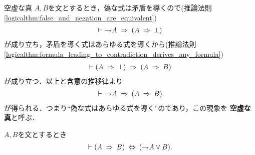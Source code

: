 	\begin{itembox}[l]{空虚な真}
		$A,B$を文とするとき，偽な式は矛盾を導くので(推論法則\ref{logicalthm:false_and_negation_are_equivalent})
		\begin{align}
			\vdash\ \negation A \rarrow (A \rarrow \bot)
		\end{align}
		が成り立ち，矛盾を導く式はあらゆる式を導くから(推論法則\ref{logicalthm:formula_leading_to_contradiction_derives_any_formula})
		\begin{align}
			\vdash (A \rarrow \bot) \rarrow (A \rarrow B)
		\end{align}
		が成り立つ．以上と含意の推移律より
		\begin{align}
			\vdash\ \negation A \rarrow (A \rarrow B)
		\end{align}
		が得られる．つまり``偽な式はあらゆる式を導く''のであり，この現象を
		{\bf 空虚な真}と呼ぶ．
	\end{itembox}
	
	\begin{screen}
		\begin{logicalthm}[含意は否定と論理和で表せる]\label{logicalthm:rule_of_inference_3}
			$A,B$を文とするとき
			\begin{align}
				\vdash (A \rarrow B) \lrarrow (\negation A \vee B).
			\end{align}
		\end{logicalthm}
	\end{screen}
	
